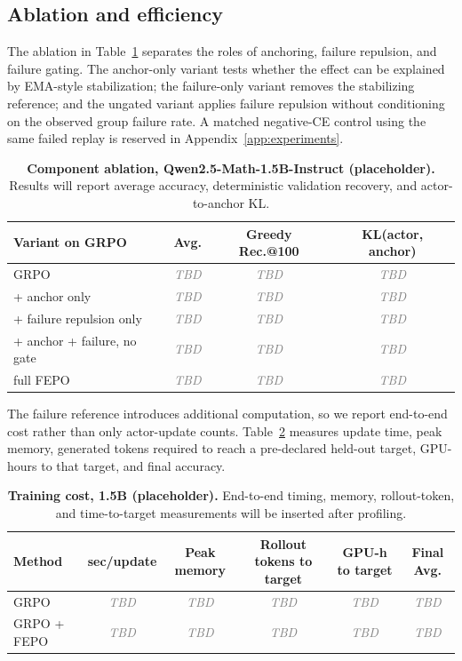 \documentclass{article}
\newcommand{\TBD}{\textcolor{gray}{\textit{TBD}}}
\newcommand{\FEPO}{\textsc{FEPO}\xspace}
\begin{document}
\subsection{Ablation and efficiency}
The ablation in Table~\ref{tab:ablation_compact} separates the roles of anchoring, failure repulsion, and failure gating. The anchor-only variant tests whether the effect can be explained by EMA-style stabilization; the failure-only variant removes the stabilizing reference; and the ungated variant applies failure repulsion without conditioning on the observed group failure rate. A matched negative-CE control using the same failed replay is reserved in Appendix~\ref{app:experiments}.

\begin{table}[t]
\centering
\small
\setlength{\tabcolsep}{5pt}
\begin{tabular}{lccc}
\toprule
Variant on GRPO & Avg. & Greedy Rec.@100 & KL(actor, anchor)\\
\midrule
GRPO & \TBD & \TBD & \TBD\\
+ anchor only & \TBD & \TBD & \TBD\\
+ failure repulsion only & \TBD & \TBD & \TBD\\
+ anchor + failure, no gate & \TBD & \TBD & \TBD\\
full \FEPO & \TBD & \TBD & \TBD\\
\bottomrule
\end{tabular}
\caption{\textbf{Component ablation, Qwen2.5-Math-1.5B-Instruct (placeholder).} Results will report average accuracy, deterministic validation recovery, and actor-to-anchor KL.}
\label{tab:ablation_compact}
\end{table}

The failure reference introduces additional computation, so we report end-to-end cost rather than only actor-update counts. Table~\ref{tab:cost_compact} measures update time, peak memory, generated tokens required to reach a pre-declared held-out target, GPU-hours to that target, and final accuracy.

\begin{table}[t]
\centering
\small
\begin{tabular}{lccccc}
\toprule
Method & sec/update & Peak memory & Rollout tokens to target & GPU-h to target & Final Avg.\\
\midrule
GRPO & \TBD & \TBD & \TBD & \TBD & \TBD\\
GRPO + \FEPO & \TBD & \TBD & \TBD & \TBD & \TBD\\
\bottomrule
\end{tabular}
\caption{\textbf{Training cost, 1.5B (placeholder).} End-to-end timing, memory, rollout-token, and time-to-target measurements will be inserted after profiling.}
\label{tab:cost_compact}
\end{table}
\end{document}
